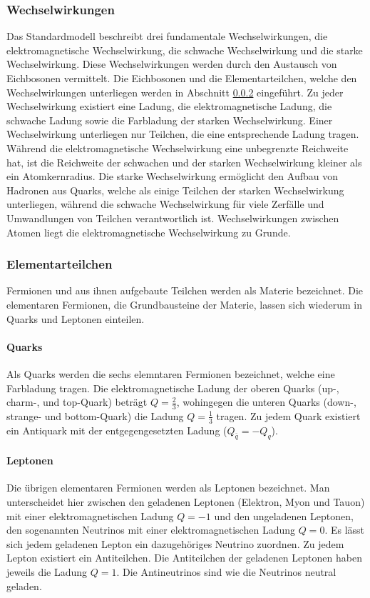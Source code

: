 \subsubsection{Wechselwirkungen}
Das Standardmodell beschreibt drei fundamentale Wechselwirkungen, die elektromagnetische Wechselwirkung, die schwache Wechselwirkung und die starke Wechselwirkung. Diese Wechselwirkungen werden durch den Austausch von Eichbosonen vermittelt. Die Eichbosonen und die Elementarteilchen, welche den Wechselwirkungen unterliegen werden in Abschnitt \ref{sec:elementarteilchen} eingeführt. Zu jeder Wechselwirkung existiert eine Ladung, die elektromagnetische Ladung, die schwache Ladung sowie die Farbladung der starken Wechselwirkung. Einer Wechselwirkung unterliegen nur Teilchen, die eine entsprechende Ladung tragen. Während die elektromagnetische Wechselwirkung eine unbegrenzte Reichweite hat, ist die Reichweite der schwachen und der starken Wechselwirkung kleiner als ein Atomkernradius. Die starke Wechselwirkung ermöglicht den Aufbau von Hadronen aus Quarks, welche als einige Teilchen der starken Wechselwirkung unterliegen, während die schwache Wechselwirkung für viele Zerfälle und Umwandlungen von Teilchen verantwortlich ist. Wechselwirkungen zwischen Atomen liegt die elektromagnetische Wechselwirkung zu Grunde.

\subsubsection{Elementarteilchen}\label{sec:elementarteilchen}
Fermionen und aus ihnen aufgebaute Teilchen werden als Materie bezeichnet. Die elementaren Fermionen, die Grundbausteine der Materie, lassen sich wiederum in Quarks und Leptonen einteilen. 
\paragraph{Quarks} Als Quarks werden die sechs elemntaren Fermionen bezeichnet, welche eine Farbladung tragen. Die elektromagnetische Ladung der oberen Quarks (up-, charm-, und top-Quark) beträgt $Q=\frac23$, wohingegen die unteren Quarks (down-, strange- und bottom-Quark) die Ladung $Q=\frac13$ tragen. Zu jedem Quark existiert ein Antiquark mit der entgegengesetzten Ladung ($Q_{\bar{q}}=-Q_q$).
\paragraph{Leptonen} Die übrigen elementaren Fermionen werden als Leptonen bezeichnet. Man unterscheidet hier zwischen den geladenen Leptonen (Elektron, Myon und Tauon) mit einer elektromagnetischen Ladung $Q=-1$ und den ungeladenen Leptonen, den sogenannten Neutrinos mit einer elektromagnetischen Ladung $Q=0$. Es lässt sich jedem geladenen Lepton ein dazugehöriges Neutrino zuordnen. Zu jedem Lepton existiert ein Antiteilchen. Die Antiteilchen der geladenen Leptonen haben jeweils die Ladung $Q=1$. Die Antineutrinos sind wie die Neutrinos neutral geladen.
